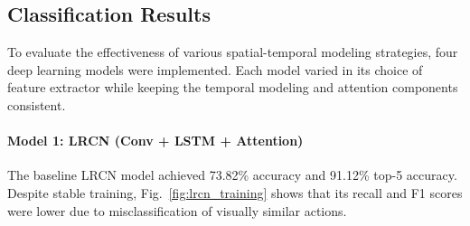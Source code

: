 \documentclass[conference]{IEEEtran}
\begin{document}
\begin{table}[h]
\centering
\caption{Parameter Counts of Models}
\label{param_counts}
\footnotesize
{}
\end{table}



\subsection{Classification Results}
To evaluate the effectiveness of various spatial-temporal modeling strategies, four deep learning models were implemented. Each model varied in its choice of feature extractor while keeping the temporal modeling and attention components consistent.

\paragraph*{Model 1: LRCN (Conv + LSTM + Attention)}
The baseline LRCN model achieved 73.82\% accuracy and 91.12\% top-5 accuracy. Despite stable training, Fig.~\ref{fig:lrcn_training} shows that its recall and F1 scores were lower due to misclassification of visually similar actions.
\end{document}
